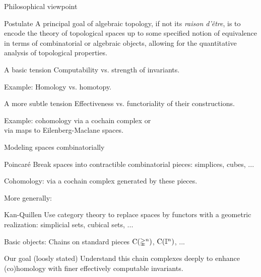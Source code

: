 \documentclass[10pt,t]{beamer} %
\begin{document}
\begin{frame}{Philosophical viewpoint}
	\vskip -10pt
	\begin{block}{Postulate}
		A principal goal of algebraic topology, if not its \textit{raison d'\^{e}tre}, is to encode the theory of topological spaces up to some specified notion of equivalence in terms of combinatorial or algebraic objects, allowing for the quantitative analysis of topological properties.
	\end{block}

	\medskip \pause
	\begin{block}{A basic tension}
		Computability vs. strength of invariants.
	\end{block}

	\medskip \textcolor{pblue}{Example:}
	Homology vs. homotopy.

	\medskip \pause
	\begin{block}{A more subtle tension}
		Effectiveness vs. functoriality of their constructions.
	\end{block}

	\medskip \textcolor{pblue}{Example:}
	cohomology via a cochain complex or \\
	\hspace*{40pt} via maps to Eilenberg-Maclane spaces.
\end{frame}

\begin{frame}{Modeling spaces combinatorially}
	\pause
	\begin{block}{Poincar\'{e}}
		Break spaces into contractible combinatorial pieces: simplices, cubes, ...
	\end{block}

	\pause \textcolor{pblue}{Cohomology:}
	via a cochain complex generated by these pieces.

	\medskip \pause	More generally:
	\begin{block}{Kan-Quillen}
		Use category theory to replace spaces by functors with a geometric realization: simplicial sets, cubical sets, ...
	\end{block}

	\pause \textcolor{pblue}{Basic objects:}
	Chains on standard pieces $\operatorname{C}(\mathbb{\Delta}^n)$, $\operatorname{C}(\mathbb{I}^n)$, ...

	\smallskip \pause
	\begin{block}{Our goal (loosly stated)}
		Understand this chain complexes deeply to enhance (co)homology with finer effectively computable invariants.
	\end{block}
\end{frame}
\end{document}
